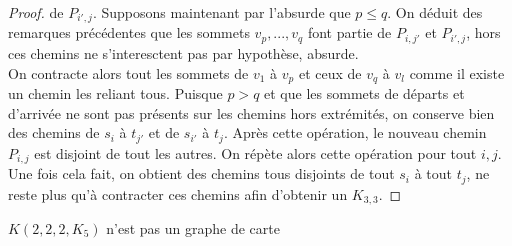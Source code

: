 \documentclass{scrartcl}
\begin{document}
\begin{flushleft}
\begin{proof}
    de $P_{i',j}$. Supposons maintenant par l'absurde que $p \leq q$. On déduit des remarques précédentes que les sommets $v_p, ..., v_q$
    font partie de $P_{i,j'}$ et $P_{i',j}$, hors ces chemins ne s'interesctent pas par hypothèse, absurde.\\
    On contracte alors tout les sommets de $v_1$ à $v_p$ et ceux de $v_q$ à $v_l$ comme il existe un chemin les reliant tous. Puisque
    $p > q$ et que les sommets de départs et d'arrivée ne sont pas présents sur les chemins hors extrémités,
    on conserve bien des chemins de $s_i$ à $t_{j'}$ et de $s_{i'}$ à $t_j$. Après cette opération, le nouveau chemin $P_{i,j}$ est disjoint
    de tout les autres. On répète alors cette opération pour tout $i,j$.\\
    Une fois cela fait, on obtient des chemins tous disjoints de tout $s_i$ à tout $t_j$, ne reste plus qu'à contracter ces chemins afin
    d'obtenir un $K_{3,3}$.
\end{proof}

\begin{prop*}[\ref{K222K5}]
    $K(2,2,2,K_5)$ n'est pas un graphe de carte
\end{prop*}


\end{flushleft}
\end{document}

